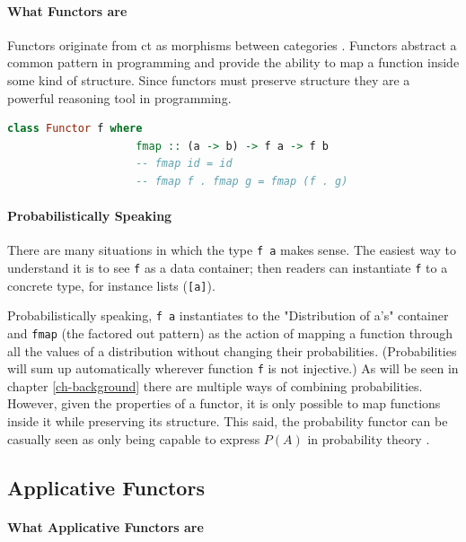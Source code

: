 \documentclass[
  oneside,
  11pt, a4paper,
  footinclude=true,
  headinclude=true,
  cleardoublepage=empty
]{scrbook}
\theoremstyle{definition}
\theoremstyle{definition}
\begin{document}
	       \paragraph{What Functors are}
	        
	Functors originate from \gls{ct} as morphisms between categories \citep{Awodey:2010:CT:2060081}. Functors abstract a common pattern in programming and provide the ability to map a function inside some kind of structure. Since functors must preserve structure they are a powerful reasoning tool in programming.
	            
	            \begin{lstlisting}[mathescape, language=Haskell, caption={Functor laws},captionpos=b]
                class Functor f where
                    fmap :: (a -> b) -> f a -> f b
                    -- fmap id = id
                    -- fmap f . fmap g = fmap (f . g)
	            \end{lstlisting}{}
	            
	       \paragraph{Probabilistically Speaking}
	        
	There are many situations in which the type \texttt{f a} makes sense. The easiest way to understand it is to see \texttt{f} as a data container; then readers can instantiate \texttt{f} to a concrete type, for instance lists (\texttt{[a]}).
	           
	Probabilistically speaking, \texttt{f a} instantiates to the "Distribution of a's" container and \texttt{fmap} (the factored out pattern) as the action of mapping a function through all the values of a distribution without changing their probabilities. (Probabilities will sum up automatically wherever function \texttt{f} is not injective.) As will be seen in chapter \ref{ch-background} there are multiple ways of combining probabilities. However, given the properties of a functor, it is only possible to map functions inside it while preserving its structure. This said, the probability functor can be casually seen as only being capable to express $P(A)$ in probability theory \citep{jtobin}.
	
	    \subsection{Applicative Functors}
	    
	        \paragraph{What Applicative Functors are}
	        
\end{document}
